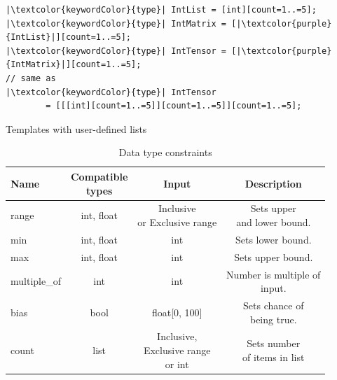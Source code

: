 \documentclass[11pt,a4paper]{article}
\begin{document}
    \begin{listing}[h]
        \begin{verbatim}
|\textcolor{keywordColor}{type}| IntList = [int][count=1..=5];
|\textcolor{keywordColor}{type}| IntMatrix = [|\textcolor{purple}{IntList}|][count=1..=5];
|\textcolor{keywordColor}{type}| IntTensor = [|\textcolor{purple}{IntMatrix}|][count=1..=5];
// same as
|\textcolor{keywordColor}{type}| IntTensor 
        = [[[int][count=1..=5]][count=1..=5]][count=1..=5];
    \end{verbatim}
        \caption{Templates with user-defined lists}
        \centering
        \label{listing:int_tensor}
    \end{listing}

    \begin{table}[h]
        \begin{tabular}{@{}|l|c|c|c|@{}}
            \hline
            \textbf{Name} & \makecell{\textbf{Compatible} \\ \textbf{types}} & \textbf{Input} & \textbf{Description} \\
            \hline
            range & int, float & \makecell{Inclusive \\ or Exclusive range} & \makecell{Sets upper \\ and lower bound.} \\
            \hline
            min & int, float & int & Sets lower bound. \\
            \hline
            max & int, float & int & Sets upper bound. \\
            \hline
            multiple\_of & int & int & \makecell{Number is multiple of \\ input.} \\
            \hline
            bias & bool & float[0, 100] & \makecell{Sets chance of \\ being true.} \\
            \hline
            count & list & \makecell{Inclusive, \\ Exclusive range \\ or int} & \makecell{Sets number \\ of items in list} \\
            \hline
        \end{tabular}
        \caption{Data type constraints}        
    \end{table}
    
\end{document}
